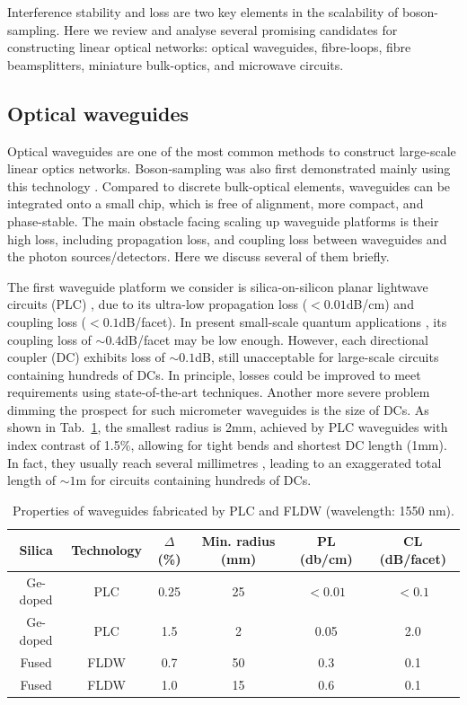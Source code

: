 \documentclass[aps,rmp,twocolumn,amsmath,amssymb,nofootinbib,superscriptaddress]{revtex4}
\begin{document}
Interference stability and loss are two key elements in the scalability of boson-sampling. Here we review and analyse several promising candidates for constructing linear optical networks: optical waveguides, fibre-loops, fibre beamsplitters, miniature bulk-optics, and microwave circuits.

\subsection{Optical waveguides}

Optical waveguides are one of the most common methods to construct large-scale linear optics networks. Boson-sampling was also first demonstrated mainly using this technology \cite{bib:4, bib:5, bib:6}. Compared to discrete bulk-optical elements, waveguides can be integrated onto a small chip, which is free of alignment, more compact, and phase-stable. The main obstacle facing scaling up waveguide platforms is their high loss, including propagation loss, and coupling loss between waveguides and the photon sources/detectors. Here we discuss several of them briefly.

The first waveguide platform we consider is silica-on-silicon planar lightwave circuits (PLC) \cite{bib:61}, due to its ultra-low propagation loss ($<0.01$dB/cm) and coupling loss ($<0.1$dB/facet). In present small-scale quantum applications \cite{bib:9}, its coupling loss of $\sim 0.4$dB/facet may be low enough. However, each directional coupler (DC) exhibits loss of $\sim 0.1$dB, still unacceptable for large-scale circuits containing hundreds of DCs. In principle, losses could be improved to meet requirements using state-of-the-art techniques. Another more severe problem dimming the prospect for such micrometer waveguides is the size of DCs. As shown in Tab.~\ref{tab:one}, the smallest radius is 2mm, achieved by PLC waveguides with index contrast of 1.5\%, allowing for tight bends and shortest DC length (1mm). In fact, they usually reach several millimetres \cite{bib:9}, leading to an exaggerated total length of $\sim 1$m for circuits containing hundreds of DCs.

\begin{table}[!htb]
\begin{tabular}{|c|c|c|c|c|c|}
\hline
Silica & Technology & $\Delta$(\%) & Min. radius (mm) & PL (db/cm) & CL (dB/facet) \\
\hline
\hline
Ge-doped & PLC  & 0.25 & 25 & $<0.01$ & $<0.1$ \\
Ge-doped & PLC  & 1.5  & 2  & 0.05    & 2.0 \\
Fused    & FLDW & 0.7  & 50 & 0.3     & 0.1 \\
Fused    & FLDW & 1.0  & 15 & 0.6     & 0.1 \\
\hline
\end{tabular} \caption{Properties of waveguides fabricated by PLC \cite{bib:61} and FLDW \cite{bib:62} (wavelength: 1550 nm).} \label{tab:one}
\end{table}
\end{document}
